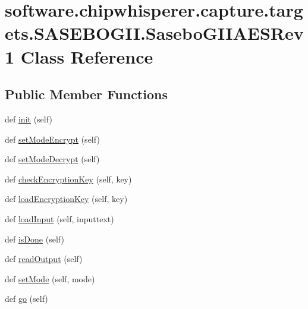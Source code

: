 \hypertarget{classsoftware_1_1chipwhisperer_1_1capture_1_1targets_1_1SASEBOGII_1_1SaseboGIIAESRev1}{}\section{software.\+chipwhisperer.\+capture.\+targets.\+S\+A\+S\+E\+B\+O\+G\+I\+I.\+Sasebo\+G\+I\+I\+A\+E\+S\+Rev1 Class Reference}
\label{classsoftware_1_1chipwhisperer_1_1capture_1_1targets_1_1SASEBOGII_1_1SaseboGIIAESRev1}
\subsection*{Public Member Functions}
\begin{DoxyCompactItemize}
\item 
def \hyperlink{classsoftware_1_1chipwhisperer_1_1capture_1_1targets_1_1SASEBOGII_1_1SaseboGIIAESRev1_ab02c6f9dfc086b07be2d3d0acc6bd33d}{init} (self)
\item 
def \hyperlink{classsoftware_1_1chipwhisperer_1_1capture_1_1targets_1_1SASEBOGII_1_1SaseboGIIAESRev1_aae380362b2c01036d8b7aa8a0410d02e}{set\+Mode\+Encrypt} (self)
\item 
def \hyperlink{classsoftware_1_1chipwhisperer_1_1capture_1_1targets_1_1SASEBOGII_1_1SaseboGIIAESRev1_a9c1995aad6eb3e5c3238aba21ead6a73}{set\+Mode\+Decrypt} (self)
\item 
def \hyperlink{classsoftware_1_1chipwhisperer_1_1capture_1_1targets_1_1SASEBOGII_1_1SaseboGIIAESRev1_a8f89970463ce793e7c3ff0c8e3cc6e46}{check\+Encryption\+Key} (self, key)
\item 
def \hyperlink{classsoftware_1_1chipwhisperer_1_1capture_1_1targets_1_1SASEBOGII_1_1SaseboGIIAESRev1_a0f743bd79a13f3dd290ad95343821f7a}{load\+Encryption\+Key} (self, key)
\item 
def \hyperlink{classsoftware_1_1chipwhisperer_1_1capture_1_1targets_1_1SASEBOGII_1_1SaseboGIIAESRev1_ad10cf5a82010b0fa175f102e05600a34}{load\+Input} (self, inputtext)
\item 
def \hyperlink{classsoftware_1_1chipwhisperer_1_1capture_1_1targets_1_1SASEBOGII_1_1SaseboGIIAESRev1_a044b6dda0a4741bb53454012aaae14ed}{is\+Done} (self)
\item 
def \hyperlink{classsoftware_1_1chipwhisperer_1_1capture_1_1targets_1_1SASEBOGII_1_1SaseboGIIAESRev1_a4c08e3bb8a9f7ec5622bc481f9a7038d}{read\+Output} (self)
\item 
def \hyperlink{classsoftware_1_1chipwhisperer_1_1capture_1_1targets_1_1SASEBOGII_1_1SaseboGIIAESRev1_ac648d5fca22671b3c4c46b875d0b9033}{set\+Mode} (self, mode)
\item 
def \hyperlink{classsoftware_1_1chipwhisperer_1_1capture_1_1targets_1_1SASEBOGII_1_1SaseboGIIAESRev1_afcfb5b35476fd65c8f6c1994f709838b}{go} (self)
\end{DoxyCompactItemize}


